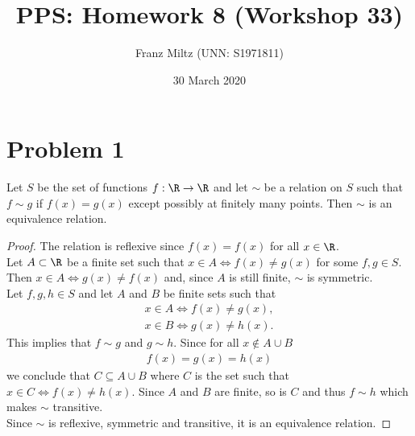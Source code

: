 \documentclass{article}
\title{PPS: Homework 8 (Workshop 33)}
\author{Franz Miltz (UNN: S1971811)}
\date{30 March 2020}
\begin{document}
\maketitle
\section*{Problem 1}
\begin{claim}
  Let $S$ be the set of functions $f:\R\to\R$ and let $\sim$ be a relation on $S$ such that $f\sim g$ if $f(x)=g(x)$ except possibly at finitely many points.
  Then $\sim$ is an equivalence relation.
\end{claim}
\begin{proof}
  The relation is reflexive since $f(x)=f(x)$ for all $x\in\R$.\\
  Let $A\subset \R$ be a finite set such that
  $
    x \in A \Leftrightarrow f(x)\not= g(x)
  $
  for some $f,g\in S$.
  Then
  $
    x\in A \Leftrightarrow g(x)\not=f(x)
  $
  and, since $A$ is still finite, $\sim$ is symmetric.\\
  Let $f,g,h \in S$ and let $A$ and $B$ be finite sets such that
  \begin{align*}
    x\in A \Leftrightarrow f(x)\not= g(x), \\
    x\in B \Leftrightarrow g(x)\not= h(x).
  \end{align*}
  This implies that $f\sim g$ and $g\sim h$. Since for all $x\not\in A\cup B$
  \begin{align*}
    f(x)=g(x)=h(x)
  \end{align*}
  we conclude that $C\subseteq A \cup B$ where $C$ is the set such that $x\in C \Leftrightarrow f(x)\not=h(x)$.
  Since $A$ and $B$ are finite, so is $C$ and thus $f\sim h$ which makes $\sim$ transitive.\\
  Since $\sim$ is reflexive, symmetric and transitive, it is an equivalence relation.
\end{proof}
\end{document}
